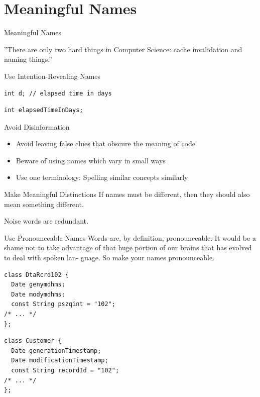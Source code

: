 \documentclass{beamer}
\begin{document}
\section{Meaningful Names}

\begin{frame}{Meaningful Names}
\begin{exampleblock}{}
  \begin{large}
  ''There are only two hard things in Computer Science: cache
  invalidation and naming things.''
  \end{large}
  \vskip5mm
  \hspace*{}
\end{exampleblock}
\end{frame}

\begin{frame}[fragile]{Use Intention-Revealing Names}
\begin{lstlisting}
int d; // elapsed time in days
\end{lstlisting}

\begin{lstlisting}
int elapsedTimeInDays;
\end{lstlisting}
\end{frame}

\begin{frame}{Avoid Disinformation}
\begin{itemize}
  \item Avoid leaving false clues that obscure the meaning of code
  \item Beware of using names which vary in small ways
  \item Use one terminology: Spelling similar concepts similarly
\end{itemize}
\end{frame}

\begin{frame}{Make Meaningful Distinctions}
If names must be different, then they should also mean something different.

Noise words are redundant.
\end{frame}

\begin{frame}[fragile]{Use Pronounceable Names}
Words are, by definition, pronounceable. It would be a shame not to take advantage of that huge portion of our brains that has evolved to deal with spoken lan-
guage. So make your names pronounceable.

\begin{lstlisting}
class DtaRcrd102 {
  Date genymdhms;
  Date modymdhms;
  const String pszqint = "102";
/* ... */
};
\end{lstlisting}

\begin{lstlisting}
class Customer {
  Date generationTimestamp;
  Date modificationTimestamp;
  const String recordId = "102";
/* ... */
};
\end{lstlisting}
\end{frame}
\end{document}
